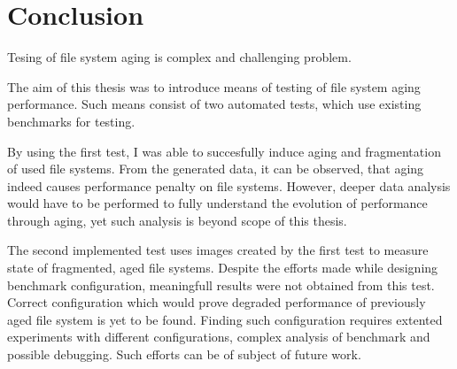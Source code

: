 \documentclass[
  color, %
  table, %
  lof,   %
  lot,   %
]{fithesis3}
\begin{document}











\chapter{Conclusion}
\label{conclusion}
Tesing of file system aging is complex and challenging problem.

The aim of this thesis was to introduce means of testing of file system aging performance. Such means consist of two automated tests, which use existing benchmarks for testing.

By using the first test, I was able to succesfully induce aging and fragmentation of used file systems. From the generated data, it can be observed, that aging indeed causes performance penalty on file systems. However, deeper data analysis would have to be performed to fully understand the evolution of performance through aging, yet such analysis is beyond scope of this thesis.

The second implemented test uses images created by the first test to measure state of fragmented, aged file systems. Despite the efforts made while designing benchmark configuration, meaningfull results were not obtained from this test. Correct configuration which would prove degraded performance of previously aged file system is yet to be found. Finding such configuration requires extented experiments with different configurations, complex analysis of benchmark and possible debugging. Such efforts can be of subject of future work.
\end{document}

